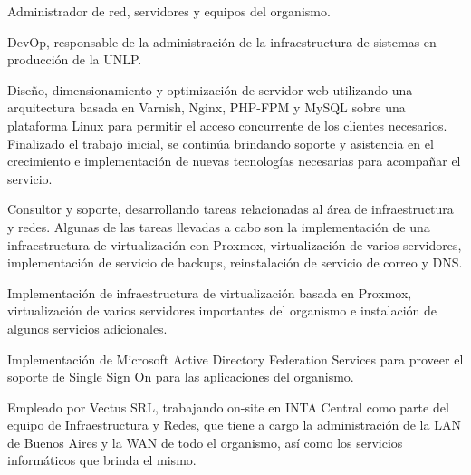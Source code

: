 \begin{cv}

Administrador de red, servidores y equipos del organismo.


DevOp, responsable de la administración de la infraestructura de sistemas en producción de
la UNLP.


Diseño, dimensionamiento y optimización de servidor web utilizando una arquitectura basada
en Varnish, Nginx, PHP-FPM y MySQL sobre una plataforma Linux para permitir el acceso
concurrente de los clientes necesarios. Finalizado el trabajo inicial, se continúa
brindando soporte y asistencia en el crecimiento e implementación de nuevas tecnologías
necesarias para acompañar el servicio.


Consultor y soporte, desarrollando tareas relacionadas al área de infraestructura y redes.
Algunas de las tareas llevadas a cabo son la implementación de una infraestructura de
virtualización con Proxmox, virtualización de varios servidores, implementación de
servicio de backups, reinstalación de servicio de correo y DNS.


Implementación de infraestructura de virtualización basada en Proxmox, virtualización de
varios servidores importantes del organismo e instalación de algunos servicios
adicionales.


Implementación de Microsoft Active Directory Federation Services para proveer el soporte
de Single Sign On para las aplicaciones del organismo.


Empleado por Vectus SRL, trabajando on-site en INTA Central como parte del equipo de
Infraestructura y Redes, que tiene a cargo la administración de la LAN de Buenos Aires y
la WAN de todo el organismo, así como los servicios informáticos que brinda el mismo.



\end{cv}
